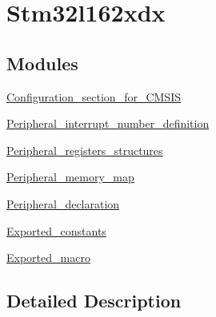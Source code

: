 \hypertarget{group__stm32l162xdx}{\section{Stm32l162xdx}
\label{group__stm32l162xdx}
}
\subsection*{Modules}
\begin{DoxyCompactItemize}
\item 
\hyperlink{group___configuration__section__for___c_m_s_i_s}{Configuration\-\_\-section\-\_\-for\-\_\-\-C\-M\-S\-I\-S}
\item 
\hyperlink{group___peripheral__interrupt__number__definition}{Peripheral\-\_\-interrupt\-\_\-number\-\_\-definition}
\item 
\hyperlink{group___peripheral__registers__structures}{Peripheral\-\_\-registers\-\_\-structures}
\item 
\hyperlink{group___peripheral__memory__map}{Peripheral\-\_\-memory\-\_\-map}
\item 
\hyperlink{group___peripheral__declaration}{Peripheral\-\_\-declaration}
\item 
\hyperlink{group___exported__constants}{Exported\-\_\-constants}
\item 
\hyperlink{group___exported__macro}{Exported\-\_\-macro}
\end{DoxyCompactItemize}


\subsection{Detailed Description}
